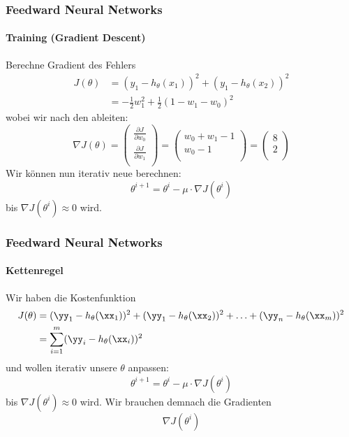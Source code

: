 \documentclass[german,aspectratio=169]{beamer}
\begin{document}
\begin{frame}
	\frametitle{Feedward Neural Networks}
	\framesubtitle{Training (Gradient Descent)}
	Berechne Gradient des Fehlers
	\begin{equation*}
		\begin{split}
			J(\theta) &= (y_1 - h_\theta(x_1))^2 + (y_1 - h_\theta(x_2))^2\\
			&= -\frac{1}{2} w_1^2 + \frac{1}{2}(1 - w_1 - w_0)^2
		\end{split}
	\end{equation*}
	wobei wir nach den  ableiten:
	\begin{equation*}
		\nabla J(\theta) = \begin{pmatrix}
			\frac{\partial J}{\partial w_0} \\
			\frac{\partial J}{\partial w_1} \\
		\end{pmatrix} = \begin{pmatrix}
			w_0 + w_1 - 1  \\
			w_0 - 1  \\
		\end{pmatrix} = \begin{pmatrix}
			8  \\
			2\\
		\end{pmatrix}
	\end{equation*}
	Wir können nun iterativ neue  berechnen:
	\begin{equation*}
		\theta^{i+1} = \theta^{i} - \mu \cdot \nabla J(\theta^i)
	\end{equation*}
	bis $ \nabla J(\theta^i) \approx 0$ wird.
\end{frame}

\begin{frame}
	\frametitle{Feedward Neural Networks}
	\framesubtitle{Kettenregel}
	Wir haben die Kostenfunktion
	\begin{equation*}
		\begin{split}
		J(\theta) &= (\yy_1 - h_\theta(\xx_1))^2 + (\yy_1 - h_\theta(\xx_2))^2 + \ldots + (\yy_n - h_\theta(\xx_m))^2\\
		&= \sum\limits_{i = 1}^m (\yy_i - h_\theta(\xx_i))^2
		\end{split}
	\end{equation*}
	und wollen iterativ unsere  $\theta$ anpassen:
	\begin{equation*}
		\theta^{i+1} = \theta^{i} - \mu \cdot \nabla J(\theta^i)
	\end{equation*}
	bis $ \nabla J(\theta^i) \approx 0$ wird. Wir brauchen demnach die Gradienten
	\begin{equation*}
		\nabla J(\theta^i)
	\end{equation*}
\end{frame}
\end{document}
